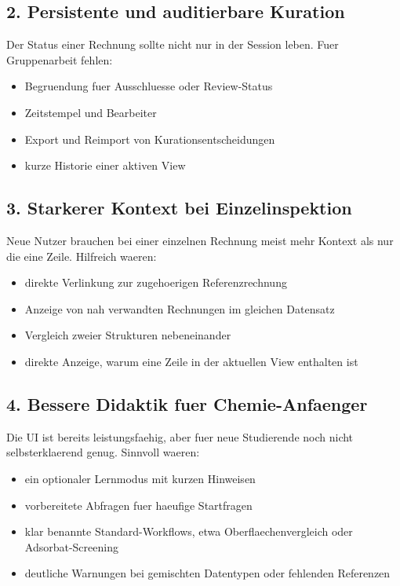\documentclass[11pt,a4paper]{article}
\begin{document}
\subsection*{2. Persistente und auditierbare Kuration}
Der Status einer Rechnung sollte nicht nur in der Session leben. Fuer Gruppenarbeit fehlen:
\begin{itemize}
  \item Begruendung fuer Ausschluesse oder Review-Status
  \item Zeitstempel und Bearbeiter
  \item Export und Reimport von Kurationsentscheidungen
  \item kurze Historie einer aktiven View
\end{itemize}

\subsection*{3. Starkerer Kontext bei Einzelinspektion}
Neue Nutzer brauchen bei einer einzelnen Rechnung meist mehr Kontext als nur die eine Zeile. Hilfreich waeren:
\begin{itemize}
  \item direkte Verlinkung zur zugehoerigen Referenzrechnung
  \item Anzeige von nah verwandten Rechnungen im gleichen Datensatz
  \item Vergleich zweier Strukturen nebeneinander
  \item direkte Anzeige, warum eine Zeile in der aktuellen View enthalten ist
\end{itemize}

\subsection*{4. Bessere Didaktik fuer Chemie-Anfaenger}
Die UI ist bereits leistungsfaehig, aber fuer neue Studierende noch nicht selbsterklaerend genug. Sinnvoll waeren:
\begin{itemize}
  \item ein optionaler Lernmodus mit kurzen Hinweisen
  \item vorbereitete Abfragen fuer haeufige Startfragen
  \item klar benannte Standard-Workflows, etwa Oberflaechenvergleich oder Adsorbat-Screening
  \item deutliche Warnungen bei gemischten Datentypen oder fehlenden Referenzen
\end{itemize}
\end{document}
